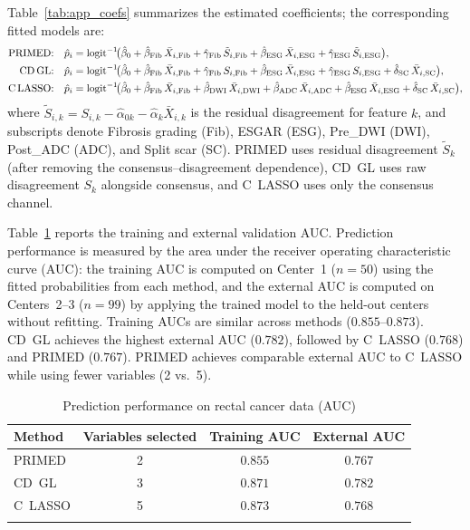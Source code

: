 \documentclass[referee,lineno,pdflatex,sn-vancouver-num]{sn-jnl}
\begin{document}
Table~\ref{tab:app_coefs} summarizes the estimated coefficients; the corresponding fitted models are:
\begin{align*}
  \text{PRIMED:} \quad \hat p_i &= \mathrm{logit}^{-1}\!\bigl(\hat\beta_0 + \hat\beta_{\mathrm{Fib}}\,\bar X_{i,\mathrm{Fib}} + \hat\gamma_{\mathrm{Fib}}\,\tilde S_{i,\mathrm{Fib}} + \hat\beta_{\mathrm{ESG}}\,\bar X_{i,\mathrm{ESG}} + \hat\gamma_{\mathrm{ESG}}\,\tilde S_{i,\mathrm{ESG}}\bigr), \\
  \text{CD\,GL:} \quad \hat p_i &= \mathrm{logit}^{-1}\!\bigl(\hat\beta_0 + \hat\beta_{\mathrm{Fib}}\,\bar X_{i,\mathrm{Fib}} + \hat\gamma_{\mathrm{Fib}}\, S_{i,\mathrm{Fib}} + \hat\beta_{\mathrm{ESG}}\,\bar X_{i,\mathrm{ESG}} + \hat\gamma_{\mathrm{ESG}}\, S_{i,\mathrm{ESG}} + \hat\delta_{\mathrm{SC}}\,\bar X_{i,\mathrm{SC}}\bigr), \\
  \text{C\,LASSO:} \quad \hat p_i &= \mathrm{logit}^{-1}\!\bigl(\hat\beta_0 + \hat\beta_{\mathrm{Fib}}\,\bar X_{i,\mathrm{Fib}} + \hat\beta_{\mathrm{DWI}}\,\bar X_{i,\mathrm{DWI}} + \hat\beta_{\mathrm{ADC}}\,\bar X_{i,\mathrm{ADC}} + \hat\beta_{\mathrm{ESG}}\,\bar X_{i,\mathrm{ESG}} + \hat\delta_{\mathrm{SC}}\,\bar X_{i,\mathrm{SC}}\bigr),
\end{align*}
where $\tilde S_{i,k} = S_{i,k} - \hat\alpha_{0k} - \hat\alpha_k \bar X_{i,k}$ is the residual disagreement for feature $k$, and subscripts denote Fibrosis grading (Fib), ESGAR (ESG), Pre\_DWI (DWI), Post\_ADC (ADC), and Split scar (SC).
PRIMED uses residual disagreement $\tilde S_k$ (after removing the consensus--disagreement dependence), CD~GL uses raw disagreement $S_k$ alongside consensus, and C~LASSO uses only the consensus channel.

Table~\ref{tab:app_auc} reports the training and external validation AUC.
Prediction performance is measured by the area under the receiver operating characteristic curve (AUC): the training AUC is computed on Center~1 ($n = 50$) using the fitted probabilities from each method, and the external AUC is computed on Centers~2--3 ($n = 99$) by applying the trained model to the held-out centers without refitting.
Training AUCs are similar across methods ($0.855$--$0.873$).
CD~GL achieves the highest external AUC ($0.782$), followed by C~LASSO ($0.768$) and PRIMED ($0.767$).
PRIMED achieves comparable external AUC to C~LASSO while using fewer variables (2 vs.\ 5).

\begin{table}[h]
\caption{Prediction performance on rectal cancer data (AUC)}\label{tab:app_auc}
\small
\renewcommand{\arraystretch}{1.1}
\begin{tabular*}{\textwidth}{@{\extracolsep\fill}lccc}
\toprule
Method & Variables selected & Training AUC & External AUC \\
\midrule
PRIMED       & 2 & $0.855$ & $0.767$ \\
CD~GL        & 3 & $0.871$ & $\mathbf{0.782}$ \\
C~LASSO      & 5 & $0.873$ & $0.768$ \\
\botrule
\end{tabular*}
\end{table}
\end{document}
